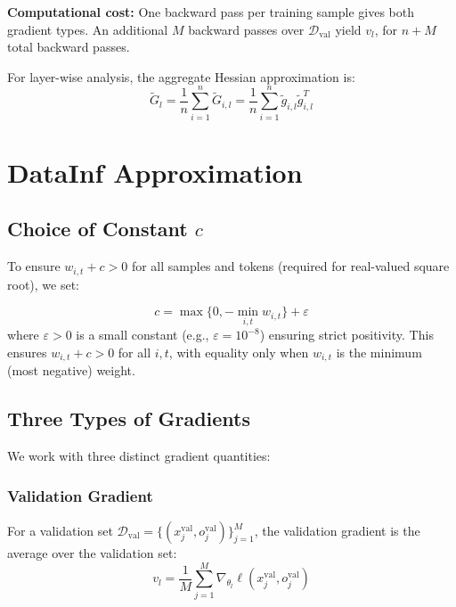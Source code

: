\documentclass{article}
\begin{document}
\textbf{Computational cost:} One backward pass per training sample gives both gradient types. An additional $M$ backward passes over $\mathcal{D}_{\mathrm{val}}$ yield $v_l$, for $n + M$ total backward passes.

For layer-wise analysis, the aggregate Hessian approximation is:
\begin{equation}
\tilde{G}_l = \frac{1}{n}\sum_{i=1}^n \tilde{G}_{i,l} = \frac{1}{n}\sum_{i=1}^n \tilde{g}_{i,l}\tilde{g}_{i,l}^T
\end{equation}








\section{DataInf Approximation}



\subsection{Choice of Constant $c$}

To ensure $w_{i,t} + c > 0$ for all samples and tokens (required for real-valued square root), we set:

\begin{equation}
c = \max\{0, -\min_{i,t} w_{i,t}\} + \varepsilon
\end{equation}
where $\varepsilon > 0$ is a small constant (e.g., $\varepsilon = 10^{-8}$) ensuring strict positivity.
This ensures $w_{i,t} + c > 0$ for all $i,t$, with equality only when $w_{i,t}$ is the minimum (most negative) weight.

\subsection{Three Types of Gradients}

We work with three distinct gradient quantities:

\subsubsection{Validation Gradient}

For a validation set $\mathcal{D}_{\mathrm{val}} = \{(x_j^{\mathrm{val}}, o_j^{\mathrm{val}})\}_{j=1}^M$, the validation gradient is the average over the validation set:
\begin{equation}
v_l = \frac{1}{M}\sum_{j=1}^{M} \nabla_{\theta_l} \ell(x_j^{\mathrm{val}}, o_j^{\mathrm{val}})
\end{equation}
\end{document}
